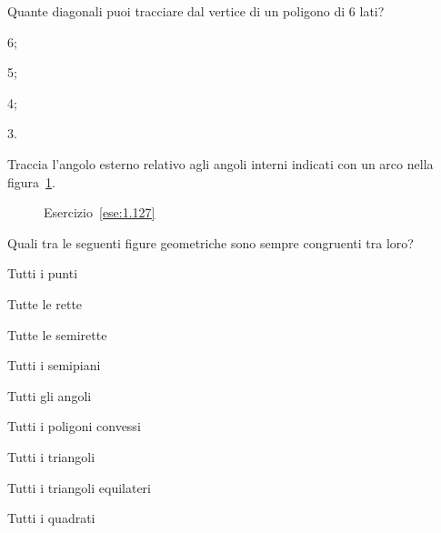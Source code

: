 \begin{esercizio}
\label{ese:1.126}
Quante diagonali puoi tracciare dal vertice di un poligono di 6 lati?
\begin{multicols}{4}
\begin{enumeratea}
\item 6;
\item 5;
\item 4;
\item 3.
\end{enumeratea}
\end{multicols}
\end{esercizio}

\begin{esercizio}
\label{ese:1.127}
Traccia l'angolo esterno relativo agli angoli interni indicati con un 
arco nella figura~\ref{fig:ese1.127}.
\end{esercizio}


\begin{inaccessibleblock}
 \begin{figure}[htb]
 \centering
 \caption{Esercizio~\ref{ese:1.127}}\label{fig:ese1.127}
\end{figure}
\end{inaccessibleblock}

\begin{esercizio}
\label{ese:1.128}
Quali tra le seguenti figure geometriche sono sempre congruenti tra 
loro?
\begin{multicols}{2}
\begin{enumeratea}
\item Tutti i punti				
\tab\tab\boxV\quad\boxF
\item Tutte le rette				
\tab\tab\boxV\quad\boxF
\item Tutte le semirette				
\tab\boxV\quad\boxF
\item Tutti i semipiani				\tab\boxV\quad\boxF
\item Tutti gli angoli			\tab\tab\boxV\quad\boxF
\item Tutti i poligoni convessi		\tab\boxV\quad\boxF
\item Tutti i triangoli			\tab\tab\boxV\quad\boxF
\item Tutti i triangoli equilateri	\tab\boxV\quad\boxF
\item Tutti i quadrati			\tab\tab\boxV\quad\boxF
\end{enumeratea}
\end{multicols}
\end{esercizio}

